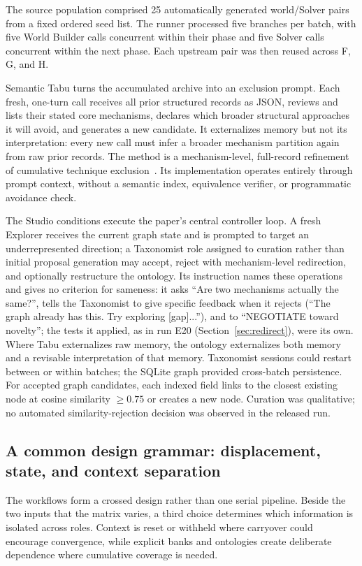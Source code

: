 \documentclass[11pt,a4paper]{article}
\begin{document}
The source population comprised 25 automatically generated world/Solver pairs from a fixed ordered seed list. The runner processed five branches per batch, with five World Builder calls concurrent within their phase and five Solver calls concurrent within the next phase. Each upstream pair was then reused across F, G, and H.

Semantic Tabu turns the accumulated archive into an exclusion prompt. Each fresh, one-turn call receives all prior structured records as JSON, reviews and lists their stated core mechanisms, declares which broader structural approaches it will avoid, and generates a new candidate. It externalizes memory but not its interpretation: every new call must infer a broader mechanism partition again from raw prior records. The method is a mechanism-level, full-record refinement of cumulative technique exclusion~\cite{lu2025}. Its implementation operates entirely through prompt context, without a semantic index, equivalence verifier, or programmatic avoidance check.

The Studio conditions execute the paper's central controller loop. A fresh Explorer receives the current graph state and is prompted to target an underrepresented direction; a Taxonomist role assigned to curation rather than initial proposal generation may accept, reject with mechanism-level redirection, and optionally restructure the ontology. Its instruction names these operations and gives no criterion for sameness: it asks ``Are two mechanisms actually the same?'', tells the Taxonomist to give specific feedback when it rejects (``The graph already has this. Try exploring [gap]...''), and to ``NEGOTIATE toward novelty''; the tests it applied, as in run E20 (Section~\ref{sec:redirect}), were its own. Where Tabu externalizes raw memory, the ontology externalizes both memory and a revisable interpretation of that memory. Taxonomist sessions could restart between or within batches; the SQLite graph provided cross-batch persistence. For accepted graph candidates, each indexed field links to the closest existing node at cosine similarity $\geq0.75$ or creates a new node. Curation was qualitative; no automated similarity-rejection decision was observed in the released run.

\subsection{A common design grammar: displacement, state, and context separation}

The workflows form a crossed design rather than one serial pipeline. Beside the two inputs that the matrix varies, a third choice determines which information is isolated across roles. Context is reset or withheld where carryover could encourage convergence, while explicit banks and ontologies create deliberate dependence where cumulative coverage is needed.
\end{document}
